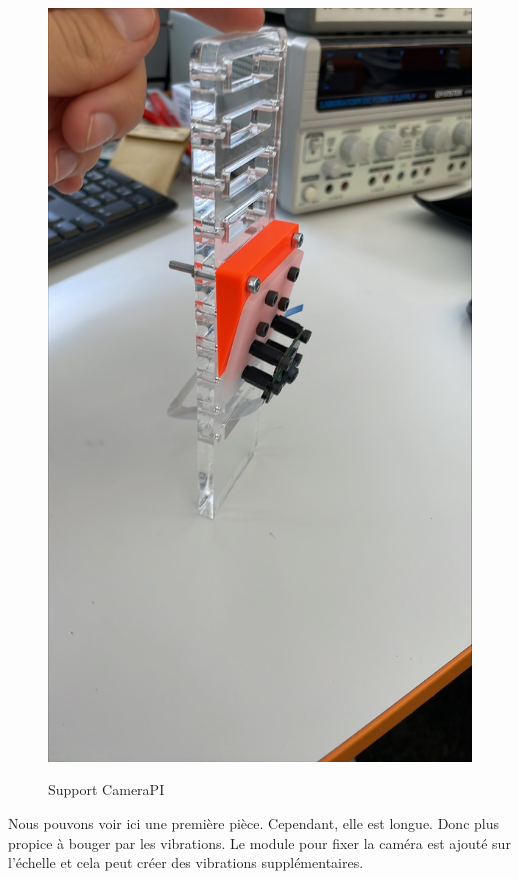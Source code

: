 \documentclass[
	a4paper,									%
	11pt,										%
	twoside,									%
	openright,									%
	notitlepage,									%
	parskip=half,								%
]{scrreprt}										%
\begin{document}
\begin{figure}[!ht]
	\centering 
	\includegraphics[scale=.1]{img/SupportCameraPI.png}
	\label{SupportCameraPI}
	\caption{Support CameraPI}	
\end{figure}

Nous pouvons voir ici une première pièce. Cependant, elle est longue. Donc plus propice à bouger par les vibrations. 
Le module pour fixer la caméra est ajouté sur l'échelle et cela peut créer des vibrations supplémentaires. \par
\end{document}
